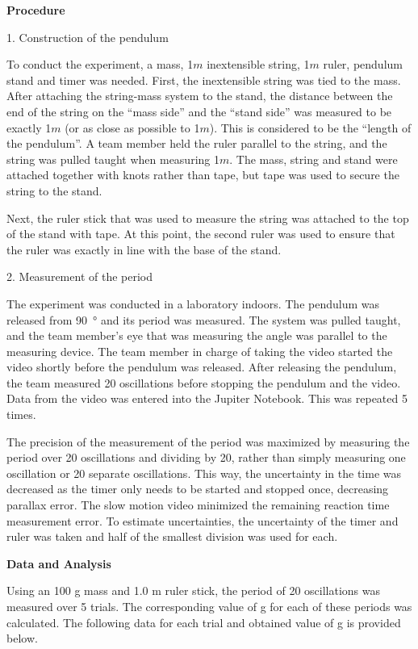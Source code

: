 \textbf{Procedure}

1. Construction of the pendulum

To conduct the experiment, a mass, 1$\si{m}$ inextensible string, 1$\si{m}$ ruler, pendulum stand and timer was needed. First, the inextensible string was tied to the mass. After attaching the string-mass system to the stand, the distance between the end of the string on the ``mass side'' and the ``stand side'' was measured to be exactly 1$\si{m}$ (or as close as possible to 1$\si{m}$). This is considered to be the ``length of the pendulum''. A team member held the ruler parallel to the string, and the string was pulled taught when measuring 1$\si{m}$. The mass, string and stand were attached together with knots rather than tape, but tape was used to secure the string to the stand.

Next, the ruler stick that was used to measure the string was attached to the top of the stand with tape. At this point, the second ruler was used to ensure that the ruler was exactly in line with the base of the stand.

2. Measurement of the period

The experiment was conducted in a laboratory indoors. The pendulum was released from \SI{90}{\degree} and its period was measured. The system was pulled taught, and the team member's eye that was measuring the angle was parallel to the measuring device. The team member in charge of taking the video started the video shortly before the pendulum was released. After releasing the pendulum, the team measured 20 oscillations before stopping the pendulum and the video. Data from the video was entered into the Jupiter Notebook. This was repeated 5 times.

The precision of the measurement of the period was maximized by measuring the period over 20 oscillations and dividing by 20, rather than simply measuring one oscillation or 20 separate oscillations. This way, the uncertainty in the time was decreased as the timer only needs to be started and stopped once, decreasing parallax error. The slow motion video minimized the remaining reaction time measurement error. To estimate uncertainties, the uncertainty of the timer and ruler was taken and half of the smallest division was used for each.

\textbf{Data and Analysis}

Using an 100 g mass and 1.0 m ruler stick, the period of 20 oscillations was measured over 5 trials. The corresponding value of g for each of these periods was calculated. The following data for each trial and obtained value of g is provided below. 

